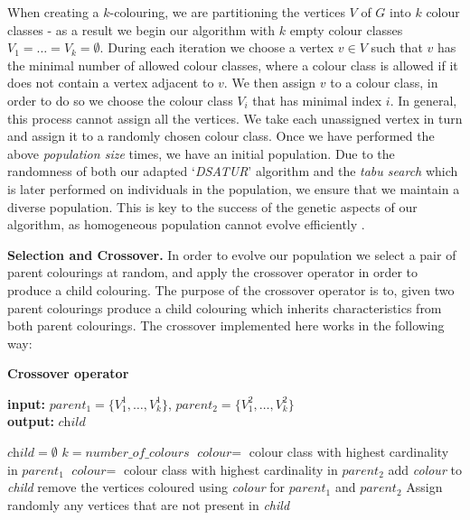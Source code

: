 \documentclass[12pt,a4paper]{article}
\begin{document}
\par When creating a $k$-colouring, we are partitioning the vertices $V$ of $G$ into $k$ colour classes - as a result we begin our algorithm with $k$ empty colour classes $V_1 =  \dots = V_k = \emptyset$. During each iteration we choose a vertex $v \in V$ such that $v$ has the minimal number of allowed colour classes, where a colour class is allowed if it does not contain a vertex adjacent to $v$. We then assign $v$ to a colour class, in order to do so we choose the colour class $V_i$ that has minimal index $i$. In general, this process cannot assign all the vertices. We take each unassigned vertex in turn and assign it to a randomly chosen colour class. Once we have performed the above \textit{population size} times, we have an initial population. Due to the randomness of both our adapted `\textit{DSATUR}' algorithm and the \textit{tabu search} which is later performed on individuals in the population, we ensure that we maintain a diverse population. This is key to the success of the genetic aspects of our algorithm, as homogeneous population cannot evolve efficiently \cite{Hao}.
\par \textbf{Selection and Crossover.} In order to evolve our population we select a pair of parent colourings at random, and apply the crossover operator in order to produce a child colouring. The purpose of the crossover operator is to, given two parent colourings produce a child colouring which inherits characteristics from both parent colourings. The crossover implemented here works in the following way:
\begin{algorithm}
  \caption*{\textbf{Crossover operator}}
  \textbf{input:} $parent_1 = \{V_1^1, \dots, V_k^1\}$,\hspace{0.1cm}  $parent_2 = \{V_1^2, \dots, V_k^2\}$\\
  \textbf{output:} $\textit{child}$
  \begin{algorithmic}[1]
  	\State $\textit{child} = \emptyset $
  	\State $k = \textit{number\_of\_colours}$ 
  	\State $\textit{colour} =$ colour class with highest cardinality in $parent_1$
  	\Else
  	\State $\textit{colour} =$ colour class with highest cardinality in $parent_2$
  	\EndIf
  	\State add \textit{colour} to \textit{child}
  	\State remove the vertices coloured using \textit{colour} for $parent_1$ and $parent_2$
  	\EndFor
  	\State Assign randomly any vertices that are not present in \textit{child}
  \end{algorithmic}
\end{algorithm}
\end{document}
